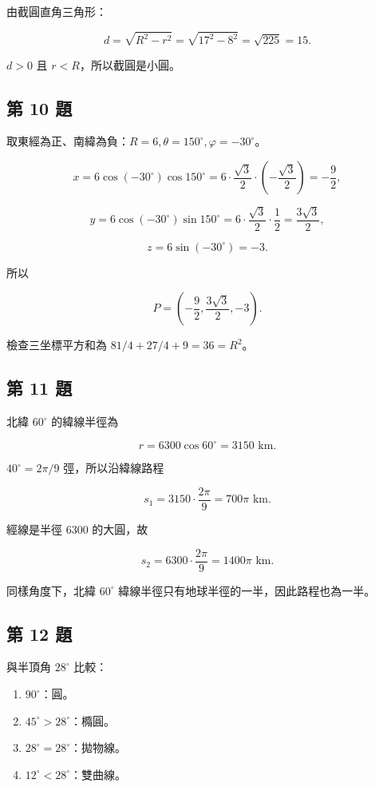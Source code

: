 \documentclass[11pt,a4paper]{article}
\providecommand{\tightlist}{%
  \setlength{\itemsep}{0pt}\setlength{\parskip}{0pt}}
\begin{document}
由截圓直角三角形：

\[
d=\sqrt{R^2-r^2}=\sqrt{17^2-8^2}=\sqrt{225}=15.
\]

\(d>0\) 且 \(r<R\)，所以截圓是小圓。

\subsection{第 10 題}\label{ux7b2c-10-ux984c}

取東經為正、南緯為負：\(R=6,\theta=150^\circ,\varphi=-30^\circ\)。

\[
x=6\cos(-30^\circ)\cos150^\circ
=6\cdot\frac{\sqrt3}{2}\cdot\left(-\frac{\sqrt3}{2}\right)
=-\frac92,
\]

\[
y=6\cos(-30^\circ)\sin150^\circ
=6\cdot\frac{\sqrt3}{2}\cdot\frac12
=\frac{3\sqrt3}{2},
\]

\[
z=6\sin(-30^\circ)=-3.
\]

所以

\[
P=\left(-\frac92,\frac{3\sqrt3}{2},-3\right).
\]

檢查三坐標平方和為 \(81/4+27/4+9=36=R^2\)。

\subsection{第 11 題}\label{ux7b2c-11-ux984c}

北緯 \(60^\circ\) 的緯線半徑為

\[
r=6300\cos60^\circ=3150\text{ km}.
\]

\(40^\circ=2\pi/9\) 弳，所以沿緯線路程

\[
s_1=3150\cdot\frac{2\pi}{9}=700\pi\text{ km}.
\]

經線是半徑 \(6300\) 的大圓，故

\[
s_2=6300\cdot\frac{2\pi}{9}=1400\pi\text{ km}.
\]

同樣角度下，北緯 \(60^\circ\) 緯線半徑只有地球半徑的一半，因此路程也為一半。

\subsection{第 12 題}\label{ux7b2c-12-ux984c}

與半頂角 \(28^\circ\) 比較：

\begin{enumerate}
\def\labelenumi{\arabic{enumi}.}
\tightlist
\item
  \(90^\circ\)：圓。
\item
  \(45^\circ>28^\circ\)：橢圓。
\item
  \(28^\circ=28^\circ\)：拋物線。
\item
  \(12^\circ<28^\circ\)：雙曲線。
\end{enumerate}
\end{document}

